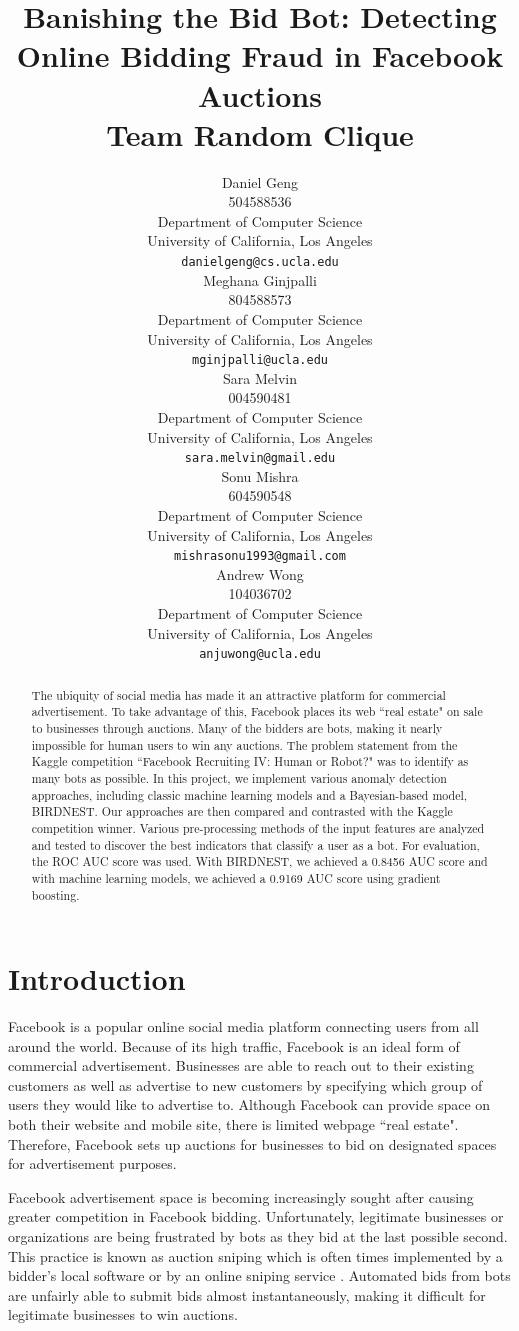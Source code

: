 \documentclass{article} %
\title{Banishing the Bid Bot: Detecting Online Bidding Fraud in Facebook Auctions \\ \large Team Random Clique}
\author{
Daniel Geng \\
504588536 \\
Department of Computer Science\\
University of California, Los Angeles\\
\texttt{danielgeng@cs.ucla.edu} \\
\And
Meghana Ginjpalli \\
804588573 \\
Department of Computer Science \\
University of California, Los Angeles\\
\texttt{mginjpalli@ucla.edu} \\
\AND
Sara Melvin \\
004590481 \\
Department of Computer Science \\
University of California, Los Angeles\\
\texttt{sara.melvin@gmail.edu} \\
\And
Sonu Mishra \\
604590548 \\
Department of Computer Science\\
University of California, Los Angeles\\
\texttt{mishrasonu1993@gmail.com} \\
\And
Andrew Wong \\
104036702 \\
Department of Computer Science\\
University of California, Los Angeles\\
\texttt{anjuwong@ucla.edu} \\
}
\begin{document}
\maketitle

\begin{abstract}

The ubiquity of social media has made it an attractive platform for commercial advertisement.
To take advantage of this, Facebook places its web ``real estate" on sale to businesses through auctions.
Many of the bidders are bots, making it nearly impossible for human users to win any auctions.
The problem statement from the Kaggle competition ``Facebook Recruiting IV: Human or Robot?" was to identify as many bots as possible.
In this project, we implement various anomaly detection approaches, including classic machine learning models and a Bayesian-based model, BIRDNEST.
Our approaches are then compared and contrasted with the Kaggle competition winner.
Various pre-processing methods of the input features are analyzed and tested to discover the best indicators that classify a user as a bot.
For evaluation, the ROC AUC score was used.
With BIRDNEST, we achieved a 0.8456 AUC score and with machine learning models, we achieved a 0.9169 AUC score using gradient boosting.

\end{abstract}

\section{Introduction}

Facebook is a popular online social media platform connecting users from all around the world.
Because of its high traffic, Facebook is an ideal form of commercial advertisement.
Businesses are able to reach out to their existing customers as well as advertise to new customers by specifying which group of users they would like to advertise to.
Although Facebook can provide space on both their website and mobile site, there is limited webpage ``real estate".
Therefore, Facebook sets up auctions for businesses to bid on designated spaces for advertisement purposes.

Facebook advertisement space is becoming increasingly sought after causing greater competition in Facebook bidding.
Unfortunately, legitimate businesses or organizations are being frustrated by bots as they bid at the last possible second. This practice is known as auction sniping which is often times implemented by a bidder's local software or by an online sniping service \cite{auction}.
Automated bids from bots are unfairly able to submit bids almost instantaneously, making it difficult for legitimate businesses to win auctions.
\end{document}
